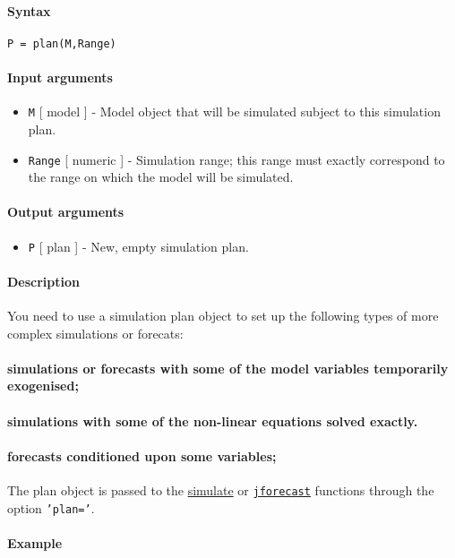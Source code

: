 


	\paragraph{Syntax}

\begin{verbatim}
P = plan(M,Range)
\end{verbatim}

\paragraph{Input arguments}

\begin{itemize}
\item
  \texttt{M} {[} model {]} - Model object that will be simulated subject
  to this simulation plan.
\item
  \texttt{Range} {[} numeric {]} - Simulation range; this range must
  exactly correspond to the range on which the model will be simulated.
\end{itemize}

\paragraph{Output arguments}

\begin{itemize}
\itemsep1pt\parskip0pt
\item
  \texttt{P} {[} plan {]} - New, empty simulation plan.
\end{itemize}

\paragraph{Description}

You need to use a simulation plan object to set up the following types
of more complex simulations or forecats:

\paragraph{simulations or forecasts with some of the model variables
temporarily
exogenised;}

\paragraph{simulations with some of the non-linear equations solved
exactly.}

\paragraph{forecasts conditioned upon some
variables;}

The plan object is passed to the \href{model/simulate}{simulate} or
\href{model/jforecast}{\texttt{jforecast}} functions through the option
\texttt{'plan='}.

\paragraph{Example}


